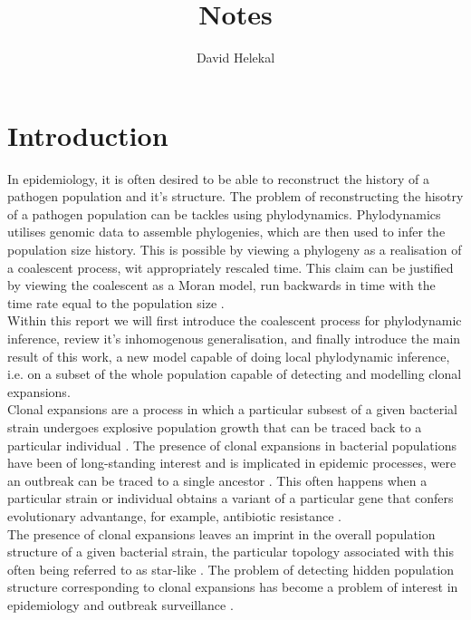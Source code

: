 \documentclass{report}
\title{Notes}
\author{David Helekal}
\theoremstyle{definition}
\begin{document}
\maketitle
\newpage
\tableofcontents
\newpage
\chapter{Introduction}
In epidemiology, it is often desired to be able to reconstruct the history of a pathogen population and it's structure. The problem of reconstructing the hisotry of a pathogen population can be tackles using phylodynamics. Phylodynamics utilises genomic data to assemble phylogenies, which are then used to infer the population size history. This is possible by viewing a phylogeny as a realisation of a coalescent process, wit appropriately rescaled time. This claim can be justified by viewing the coalescent as a Moran model, run backwards in time with the time rate equal to the population size \cite{griffiths_sampling_1994}.\\
Within this report we will first introduce the coalescent process for phylodynamic inference, review it's inhomogenous generalisation, and finally introduce the main result of this work, a new model capable of doing local phylodynamic inference, i.e. on a subset of the whole population capable of detecting and modelling clonal expansions.\\
Clonal expansions are a process in which a particular subsest of a given bacterial strain undergoes explosive population growth that can be traced back to a particular individual \cite{smith_how_1993}. The presence of clonal expansions in bacterial populations have been of long-standing interest and is implicated in epidemic processes, were an outbreak can be traced to a single ancestor \cite{smith_how_1993,spratt_displaying_2004,fraser_neutral_2005,ledda_re-emergence_2017}. This often happens when a particular strain or individual obtains a variant of a particular gene that confers evolutionary advantange, for example, antibiotic resistance \cite{holden_genomic_2013,hsu_evolutionary_2015, ledda_re-emergence_2017}.\\
The presence of clonal expansions leaves an imprint in the overall population structure of a given bacterial strain, the particular topology associated with this often being referred to as star-like \cite{smith_how_1993,spratt_displaying_2004}.
The problem of detecting hidden population structure corresponding to clonal expansions has become a problem of interest in epidemiology and outbreak surveillance \cite{volz_identification_nodate}.\\
\end{document}
